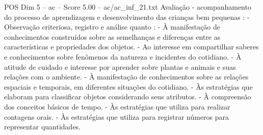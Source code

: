 \begin{textsample}{POS Dim 5 – ac – Score 5.00 – ac/ac\_inf\_21.txt}
Avaliação - acompanhamento do processo de aprendizagem e desenvolvimento das crianças bem pequenas : - Observação criteriosa, registro e análise quanto : - À manifestação de conhecimentos construídos sobre as semelhanças e diferenças entre as características e propriedades dos objetos. - Ao interesse em compartilhar saberes e conhecimentos sobre fenômenos da natureza e incidentes do cotidiano. - À atitude de cuidado e interesse por aprender sobre plantas e animais e suas relações com o ambiente. - À manifestação de conhecimentos sobre as relações espaciais e temporais, em diferentes situações do cotidiano. - Às estratégias que elaboram para classificar objetos considerando seus atributos. - À compreensão dos conceitos básicos de tempo. - Às estratégias que utiliza para realizar contagens orais. - Às estratégias que utiliza para registrar números para representar quantidades.

\end{textsample}
